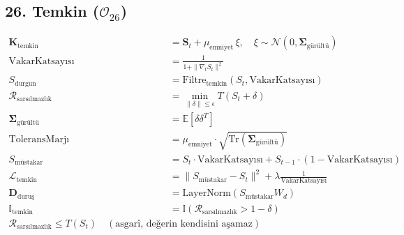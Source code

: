 \documentclass[11pt, a4paper]{article}
\begin{document}
\subsection{26. Temkin ($\mathcal{O}_{26}$)}
\begin{align}
\mathbf{K}_{\text{temkin}} &= \mathbf{S}_t + \mu_{\text{emniyet}} \, \xi, \quad \xi \sim \mathcal{N}(0, \mathbf{\Sigma}_{\text{gürültü}}) \\
\text{VakarKatsayısı} &= \frac{1}{1 + \|\nabla_t S_t\|^2} \\
S_{\text{durgun}} &= \text{Filtre}_{\text{temkin}}(S_t, \text{VakarKatsayısı}) \\
\mathcal{R}_{\text{sarsılmazlık}} &= \min_{\|\delta\| \le \epsilon} T(S_t + \delta) \\
\mathbf{\Sigma}_{\text{gürültü}} &= \mathbb{E}[\delta \delta^T] \\
\text{ToleransMarjı} &= \mu_{\text{emniyet}} \cdot \sqrt{\text{Tr}(\mathbf{\Sigma}_{\text{gürültü}})} \\
S_{\text{müstakar}} &= S_t \cdot \text{VakarKatsayısı} + S_{t-1} \cdot (1 - \text{VakarKatsayısı}) \\
\mathcal{L}_{\text{temkin}} &= \| S_{\text{müstakar}} - S_t \|^2 + \lambda \frac{1}{\text{VakarKatsayısı}} \\
\mathbf{D}_{\text{duruş}} &= \text{LayerNorm}(S_{\text{müstakar}} W_d) \\
\mathbb{I}_{\text{temkin}} &= \mathbb{I}(\mathcal{R}_{\text{sarsılmazlık}} > 1 - \delta) \\
\mathcal{R}_{\text{sarsılmazlık}} \le T(S_t) \quad (\text{asgarî, değerin kendisini aşamaz})
\end{align}
\end{document}
